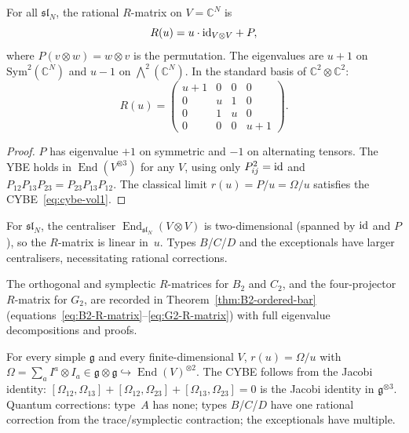 \begin{theorem}
\label{thm:yang-r-sl2}
\label{thm:yang-r-sl3}
\label{thm:yang-r-sl4}
For all $\mathfrak{sl}_N$, the rational $R$-matrix on
$V = \mathbb{C}^N$ is
\begin{equation}\label{eq:yang-sl2}
R(u) = u\cdot\mathrm{id}_{V\otimes V} + P,
\end{equation}
where $P(v\otimes w) = w\otimes v$ is the permutation.
The eigenvalues are $u{+}1$ on
$\mathrm{Sym}^2(\mathbb{C}^N)$ and $u{-}1$ on
$\bigwedge^2(\mathbb{C}^N)$. In the standard basis of\/
$\mathbb{C}^2 \otimes \mathbb{C}^2$:
\begin{equation}\label{eq:yang-sl2-matrix}
R(u) =
\begin{pmatrix}
u{+}1 & 0 & 0 & 0 \\
0 & u & 1 & 0 \\
0 & 1 & u & 0 \\
0 & 0 & 0 & u{+}1
\end{pmatrix}.
\end{equation}
\end{theorem}

\begin{proof}
$P$ has eigenvalue $+1$ on symmetric and $-1$ on alternating
tensors. The YBE holds in
$\operatorname{End}(V^{\otimes 3})$ for any $V$, using only
$P_{ij}^2 = \mathrm{id}$ and
$P_{12}P_{13}P_{23} = P_{23}P_{13}P_{12}$.
The classical limit $r(u) = P/u = \Omega/u$ satisfies the
CYBE~\eqref{eq:cybe-vol1}.
\end{proof}

\begin{remark}
\label{rem:type-a-pattern}
For $\mathfrak{sl}_N$, the centraliser
$\operatorname{End}_{\mathfrak{sl}_N}(V\otimes V)$ is
two-dimensional (spanned by $\mathrm{id}$ and $P$), so the
$R$-matrix is linear in~$u$. Types $B$/$C$/$D$ and the
exceptionals have larger centralisers, necessitating
rational corrections.
\end{remark}

The orthogonal and symplectic $R$-matrices for $B_2$ and
$C_2$, and the four-projector $R$-matrix for $G_2$, are
recorded in Theorem~\ref{thm:B2-ordered-bar}
(equations~\eqref{eq:B2-R-matrix}--\eqref{eq:G2-R-matrix})
with full eigenvalue decompositions and proofs.

\begin{remark}
\label{rem:universal-classical}
For every simple $\mathfrak{g}$ and every
finite-dimensional $V$,
$r(u) = \Omega/u$ with
$\Omega = \sum_a I^a \otimes I_a
\in \mathfrak{g} \otimes \mathfrak{g}
\hookrightarrow
\operatorname{End}(V)^{\otimes 2}$.
The CYBE follows from the Jacobi identity:
$[\Omega_{12},\Omega_{13}] + [\Omega_{12},\Omega_{23}]
+ [\Omega_{13},\Omega_{23}] = 0$ is the Jacobi identity
in $\mathfrak{g}^{\otimes 3}$.
Quantum corrections: type~$A$ has none; types $B$/$C$/$D$
have one rational correction from the trace/symplectic
contraction; the exceptionals have multiple.
\end{remark}

